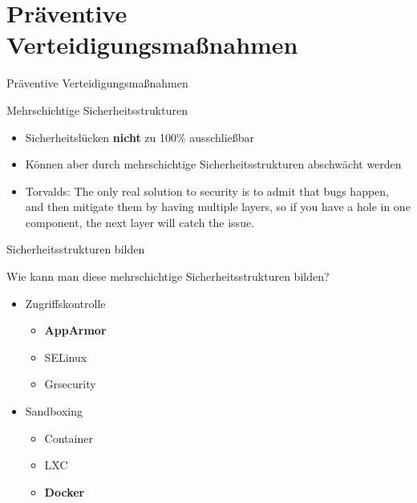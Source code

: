 \newcommand{\gqq}[1]{\glqq#1\grqq}

\section{Präventive Verteidigungsmaßnahmen}

\begin{frame}{Präventive Verteidigungsmaßnahmen}
  \begin{block}{Mehrschichtige Sicherheitsstrukturen}
    \begin{itemize}[<+->]
      \item Sicherheitslücken \textbf{nicht} zu 100\% ausschließbar
      \item Können aber durch mehrschichtige Sicherheitsstrukturen abschwächt werden
      \item Torvalds: \gqq{The only real solution to security is to admit that bugs happen, and then mitigate them by having multiple layers, so if you have a hole in one component, the next layer will catch the issue.} \footnotemark
    \end{itemize}
  \end{block}

\end{frame}

\begin{frame}{Sicherheitsstrukturen bilden}
  \begin{block}{Wie kann man diese mehrschichtige Sicherheitsstrukturen bilden?}
    \begin{itemize}[<+->]
      \item Zugriffskontrolle
      \begin{itemize}[<+->]
        \item \textbf{AppArmor}
        \item SELinux
        \item Grsecurity
      \end{itemize}
      \item Sandboxing
      \begin{itemize}[<+->]
        \item Container
        \item LXC
        \item \textbf{Docker}
      \end{itemize}
    \end{itemize}
  \end{block}
\end{frame}

